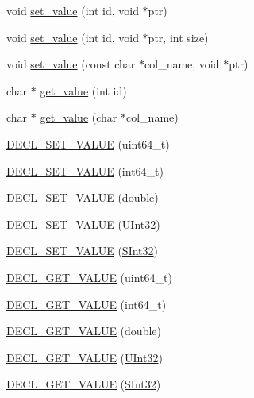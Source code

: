 \begin{DoxyCompactItemize}
void \hyperlink{classrow__t_a6abdcb268c944efe100b5a2638003c3d}{set\+\_\+value} (int id, void $\ast$ptr)
\item 
void \hyperlink{classrow__t_a0e7044d41f433552ff6f10f1fba7b191}{set\+\_\+value} (int id, void $\ast$ptr, int size)
\item 
void \hyperlink{classrow__t_a3eff865812156fd1586a59f7e1d28934}{set\+\_\+value} (const char $\ast$col\+\_\+name, void $\ast$ptr)
\item 
char $\ast$ \hyperlink{classrow__t_a92eba387d775a5d6bb975bdbee3fd0ef}{get\+\_\+value} (int id)
\item 
char $\ast$ \hyperlink{classrow__t_ab984e074eab7fca2c3f58169289ccb42}{get\+\_\+value} (char $\ast$col\+\_\+name)
\item 
\hyperlink{classrow__t_a8da3b5c8bc9a8c16744e40a5b671bb20}{D\+E\+C\+L\+\_\+\+S\+E\+T\+\_\+\+V\+A\+L\+UE} (uint64\+\_\+t)
\item 
\hyperlink{classrow__t_a77ffc30e4a43c0d45cdc828e90424e1b}{D\+E\+C\+L\+\_\+\+S\+E\+T\+\_\+\+V\+A\+L\+UE} (int64\+\_\+t)
\item 
\hyperlink{classrow__t_a938e446af20c3161f876f48ec085dee6}{D\+E\+C\+L\+\_\+\+S\+E\+T\+\_\+\+V\+A\+L\+UE} (double)
\item 
\hyperlink{classrow__t_a50db972b28ad2c1cbb381699baed729a}{D\+E\+C\+L\+\_\+\+S\+E\+T\+\_\+\+V\+A\+L\+UE} (\hyperlink{global_8h_a7e8aeec7b6541935dfc6f608cd5170ce}{U\+Int32})
\item 
\hyperlink{classrow__t_aabe31900f597869cee17fff170ffa89e}{D\+E\+C\+L\+\_\+\+S\+E\+T\+\_\+\+V\+A\+L\+UE} (\hyperlink{global_8h_a26832e96d77fcdd175f262a96add7394}{S\+Int32})
\item 
\hyperlink{classrow__t_a61baab6275ee105c148a67e57563a733}{D\+E\+C\+L\+\_\+\+G\+E\+T\+\_\+\+V\+A\+L\+UE} (uint64\+\_\+t)
\item 
\hyperlink{classrow__t_ae96087a5294e61625cceca29fe59ddd5}{D\+E\+C\+L\+\_\+\+G\+E\+T\+\_\+\+V\+A\+L\+UE} (int64\+\_\+t)
\item 
\hyperlink{classrow__t_a0c342dc9a9ab54717d0fe730a1895a5f}{D\+E\+C\+L\+\_\+\+G\+E\+T\+\_\+\+V\+A\+L\+UE} (double)
\item 
\hyperlink{classrow__t_ae5df3522bb118f1ae940ba6852586efd}{D\+E\+C\+L\+\_\+\+G\+E\+T\+\_\+\+V\+A\+L\+UE} (\hyperlink{global_8h_a7e8aeec7b6541935dfc6f608cd5170ce}{U\+Int32})
\item 
\hyperlink{classrow__t_a0784c4532fa83fc3f61ae41d2e9e6295}{D\+E\+C\+L\+\_\+\+G\+E\+T\+\_\+\+V\+A\+L\+UE} (\hyperlink{global_8h_a26832e96d77fcdd175f262a96add7394}{S\+Int32})

\end{DoxyCompactItemize}
